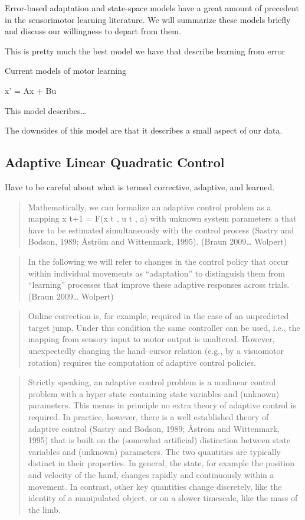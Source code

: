 \documentclass[../main.tex]{subfiles}
\begin{document}
Error-based adaptation and state-space models have a great amount of
precedent in the sensorimotor learning literature. We will summarize
these models briefly and discuss our willingness to depart from them.

This is pretty much the best model we have that describe learning from
error

Current models of motor learning

x' = Ax + Bu

This model describes\ldots{}

The downsides of this model are that it describes a small aspect of our
data.

\subsection{Adaptive Linear Quadratic
Control}\label{adaptive-linear-quadratic-control}

Have to be careful about what is termed corrective, adaptive, and
learned.

\begin{quote}
Mathematically, we can formalize an adaptive control problem as a
mapping x t+1 = F(x t , u t , a) with unknown system parameters a that
have to be estimated simultaneously with the control process (Sastry and
Bodson, 1989; Åström and Wittenmark, 1995). (Braun 2009\ldots{} Wolpert)
\end{quote}

\begin{quote}
In the following we will refer to changes in the control policy that
occur within individual movements as ``adaptation'' to distinguish them
from ``learning'' processes that improve these adaptive responses across
trials. (Braun 2009\ldots{} Wolpert)
\end{quote}

\begin{quote}
Online correction is, for example, required in the case of an
unpredicted target jump. Under this condition the same controller can be
used, i.e., the mapping from sensory input to motor output is unaltered.
However, unexpectedly changing the hand--cursor relation (e.g., by a
visuomotor rotation) requires the computation of adaptive control
policies.
\end{quote}

\begin{quote}
Strictly speaking, an adaptive control problem is a nonlinear control
problem with a hyper-state containing state variables and (unknown)
parameters. This means in principle no extra theory of adaptive control
is required. In practice, however, there is a well established theory of
adaptive control (Sastry and Bodson, 1989; Åström and Wittenmark, 1995)
that is built on the (somewhat artificial) distinction between state
variables and (unknown) parameters. The two quantities are typically
distinct in their properties. In general, the state, for example the
position and velocity of the hand, changes rapidly and continuously
within a movement. In contrast, other key quantities change discretely,
like the identity of a manipulated object, or on a slower timescale,
like the mass of the limb.
\end{quote}
\end{document}
